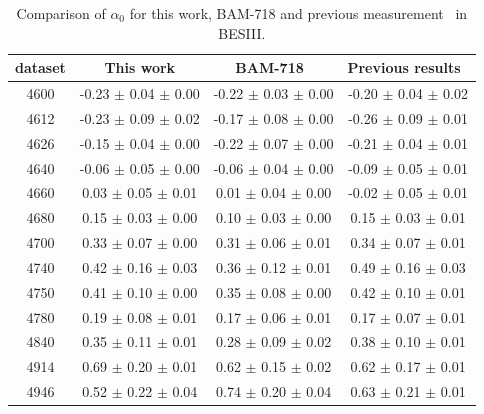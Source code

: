 \begin{table}[H]
    \centering
    \caption{Comparison of $\alpha_0$ for this work, BAM-718 and previous measurement~\cite{BESIII:2017kqg,BESIII:2023rwv} in BESIII.}
    \label{tab:alpha0-comparison}
    \begin{tabular}{cccc}
    \hline\hline
dataset & This work &  BAM-718~\cite{ESIIImemo:LcDecayAsy} & Previous results~\cite{BESIII:2017kqg,BESIII:2023rwv} \\\hline
4600 & -0.23 $\pm$ 0.04 $\pm$ 0.00 & -0.22 $\pm$ 0.03 $\pm$ 0.00 & -0.20 $\pm$ 0.04 $\pm$ 0.02 \\
4612 & -0.23 $\pm$ 0.09 $\pm$ 0.02 & -0.17 $\pm$ 0.08 $\pm$ 0.00 & -0.26 $\pm$ 0.09 $\pm$ 0.01 \\
4626 & -0.15 $\pm$ 0.04 $\pm$ 0.00 & -0.22 $\pm$ 0.07 $\pm$ 0.00 & -0.21 $\pm$ 0.04 $\pm$ 0.01 \\
4640 & -0.06 $\pm$ 0.05 $\pm$ 0.00 & -0.06 $\pm$ 0.04 $\pm$ 0.00 & -0.09 $\pm$ 0.05 $\pm$ 0.01 \\
4660 & 0.03 $\pm$ 0.05 $\pm$ 0.01 & 0.01 $\pm$ 0.04 $\pm$ 0.00 & -0.02 $\pm$ 0.05 $\pm$ 0.01 \\
4680 & 0.15 $\pm$ 0.03 $\pm$ 0.00 & 0.10 $\pm$ 0.03 $\pm$ 0.00 & 0.15 $\pm$ 0.03 $\pm$ 0.01 \\
4700 & 0.33 $\pm$ 0.07 $\pm$ 0.00 & 0.31 $\pm$ 0.06 $\pm$ 0.01 & 0.34 $\pm$ 0.07 $\pm$ 0.01 \\
4740 & 0.42 $\pm$ 0.16 $\pm$ 0.03 & 0.36 $\pm$ 0.12 $\pm$ 0.01 & 0.49 $\pm$ 0.16 $\pm$ 0.03 \\
4750 & 0.41 $\pm$ 0.10 $\pm$ 0.00 & 0.35 $\pm$ 0.08 $\pm$ 0.00 & 0.42 $\pm$ 0.10 $\pm$ 0.01 \\
4780 & 0.19 $\pm$ 0.08 $\pm$ 0.01 & 0.17 $\pm$ 0.06 $\pm$ 0.01 & 0.17 $\pm$ 0.07 $\pm$ 0.01 \\
4840 & 0.35 $\pm$ 0.11 $\pm$ 0.01 & 0.28 $\pm$ 0.09 $\pm$ 0.02 & 0.38 $\pm$ 0.10 $\pm$ 0.01 \\
4914 & 0.69 $\pm$ 0.20 $\pm$ 0.01 & 0.62 $\pm$ 0.15 $\pm$ 0.02 & 0.62 $\pm$ 0.17 $\pm$ 0.01 \\
4946 & 0.52 $\pm$ 0.22 $\pm$ 0.04 & 0.74 $\pm$ 0.20 $\pm$ 0.04 & 0.63 $\pm$ 0.21 $\pm$ 0.01 \\
\hline\hline
    \end{tabular}
\end{table}

